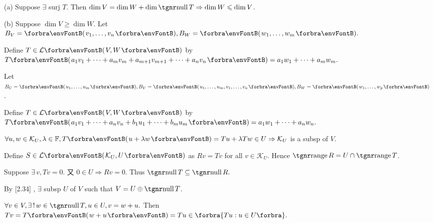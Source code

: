 \documentclass[a4paper, 11pt, UTF8]{article}
\begin{document}
\begin{large}
\par\quad
(a) Suppose $\exists$ surj $T$. Then $\dim V=\dim W+\dim\null T\Rightarrow\dim W\leqslant\dim V$.\par\quad
(b) Suppose $\dim V\geqslant\dim W.$ Let $B_V=\Par{v_1,\dots,v_n},B_W=\Par{w_1,\dots,w_m}.$\par\quad\Hb
Define $T\in\Lm{V,W}$ by $T\Par{a_1 v_1+\dots+a_m v_m+a_{m+1} v_{m+1}+\dots+a_n v_n}=a_1 w_1+\dots+a_m w_m.$\PfEnd
\SepLine

\par\quad
Let $B_U=\Par{u_1,\dots,u_m},B_V=\Par{u_1,\dots,u_m,v_1,\dots,v_n},B_W=\Par{w_1,\dots,w_p}$.\par\quad
Define $T\in\Lm{V,W}$ by $T\Par{a_1 v_1+\dots+a_n v_n+b_1 u_1+\dots+b_m u_m}=a_1 w_1+\dots+a_n w_n.$\PfEnd
\SepLine

\par\quad
$\forall u,w\in\mathcal{K}_U,\lambda\in\Fbb,T\Par{u+\lambda w}=Tu+\lambda Tw\in U\Rightarrow \mathcal{K}_U$ is a subsp of $V$.\par\quad
Define $S\in\Lm{\mathcal{K}_U,U}$ as $Rv=Tv$ for all $v\in\mathcal{K}_U$. Hence $\range R=U\cap \range T$.\par\quad
Suppose $\exists\,v,Tv=0$. 又 $0\in U\Rightarrow Rv=0$. Thus $\null T\subseteq\null R.$\PfEnd
\SepLine

\pagebreak

\par\quad
By [2.34] , $\exists$ subsp $U$ of $V$ such that $V=U\oplus\null T$.\par\quad
$\forall v\in V,\exists\,!\,w\in\null T,u\in U, v=w+u.$ Then $Tv=T\Par{w+u}=Tu\in\Bra{Tu:u\in U}.$\PfEnd
\SepLine


\end{large}
\end{document}

